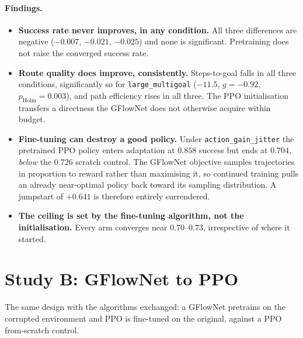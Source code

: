 \paragraph{Findings.}
\begin{itemize}
  \item \textbf{Success rate never improves, in any condition.} All three differences are negative ($-0.007$, $-0.021$, $-0.025$) and none is significant. Pretraining does not raise the converged success rate.
  \item \textbf{Route quality does improve, consistently.} Steps-to-goal falls in all three conditions, significantly so for \texttt{large\_multigoal} ($-11.5$, $g=-0.92$, $p_{\mathrm{Holm}}=0.003$), and path efficiency rises in all three. The PPO initialisation transfers a directness the GFlowNet does not otherwise acquire within budget.
  \item \textbf{Fine-tuning can destroy a good policy.} Under \texttt{action\_gain\_jitter} the pretrained PPO policy enters adaptation at $0.858$ success but ends at $0.704$, \emph{below} the $0.726$ scratch control. The GFlowNet objective samples trajectories in proportion to reward rather than maximising it, so continued training pulls an already near-optimal policy back toward its sampling distribution. A jumpstart of $+0.641$ is therefore entirely surrendered.
  \item \textbf{The ceiling is set by the fine-tuning algorithm, not the initialisation.} Every arm converges near $0.70$--$0.73$, irrespective of where it started.
\end{itemize}

\clearpage
\section{Study B: GFlowNet to PPO}

The same design with the algorithms exchanged: a GFlowNet pretrains on the
corrupted environment and PPO is fine-tuned on the original, against a PPO
from-scratch control.

